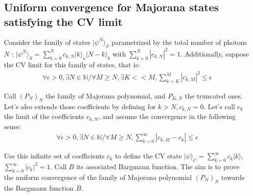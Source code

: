\documentclass[aps,prl,showpacs,twocolumn]{revtex4-2}
\providecommand{\ket}[1]{\lvert #1 \rangle}
\providecommand{\ket}[1]{\lvert #1 \rangle}
\providecommand{\ket}[1]{\lvert #1 \rangle}
\providecommand{\ket}[1]{\lvert #1 \rangle}
\begin{document}
\subsection{Uniform convergence for Majorana states satisfying the CV limit}

Consider the family of states $\ket{\psi^N}_{S }$ parametrized by the total number of photons $N$ :    $\ket{\psi^N}_{S } =\sum_{k=0}^{N} c_{k, N} \ket{k}_a\ket{N-k}_b$ with $\sum_{k=0}^{N} | c_{k, N}|^2 =1$. Additionally, suppose the CV limit for this family of states, that is:
\begin{eqnarray}
    \forall \epsilon>0, \exists N\in \mathbb{N} / \forall M \geq N, \exists K << M, \sum_{k=K}^M |c_{k,M}|^2\leq \epsilon
\end{eqnarray}

Call $(P_{N})_N$ the family of Majorana polynomial, and $P_{K,N}$ the truncated ones. Let's also extends those coefficients by defining for $k>N,  c_{k, N} = 0$. Let's call $c_k$ the limit of the coefficients $c_{k, N}$, and assume the convergence in the following sense:
\begin{eqnarray}
    \forall \epsilon>0, \exists N\in \mathbb{N}/ \forall M\geq N,\sum_{k=0}^\infty |c_{k,M}-c_k|\leq \epsilon
\end{eqnarray}

Use this infinite set of coefficients $c_k$ to define the CV state $\ket{\psi}_{C} = \sum_{k=0}^{\infty} c_k \ket{k}$,  $ \sum_{k=0}^\infty|c_{k}|^2 =1 $. Call $B$ its associated Bargmann function. The aim is to prove the uniform convergence of the family of Majorana polynomial $(P_{N})_N$ towards the Bargmann function $B$.
\end{document}
